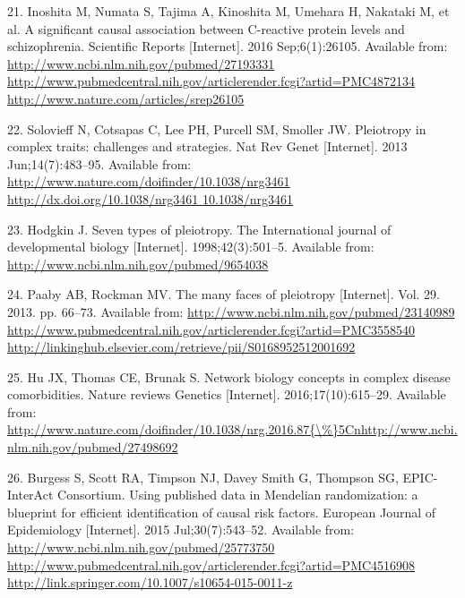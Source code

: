 \documentclass[]{article}
\begin{document}
\hypertarget{ref-Inoshita2016}{}
21. Inoshita M, Numata S, Tajima A, Kinoshita M, Umehara H, Nakataki M,
et al. A significant causal association between C-reactive protein
levels and schizophrenia. Scientific Reports {[}Internet{]}. 2016
Sep;6(1):26105. Available from:
\href{http://www.ncbi.nlm.nih.gov/pubmed/27193331\%20http://www.pubmedcentral.nih.gov/articlerender.fcgi?artid=PMC4872134\%20http://www.nature.com/articles/srep26105}{http://www.ncbi.nlm.nih.gov/pubmed/27193331 http://www.pubmedcentral.nih.gov/articlerender.fcgi?artid=PMC4872134 http://www.nature.com/articles/srep26105}

\hypertarget{ref-Solovieff2013}{}
22. Solovieff N, Cotsapas C, Lee PH, Purcell SM, Smoller JW. Pleiotropy
in complex traits: challenges and strategies. Nat Rev Genet
{[}Internet{]}. 2013 Jun;14(7):483--95. Available from:
\href{http://www.nature.com/doifinder/10.1038/nrg3461\%20http://dx.doi.org/10.1038/nrg3461\%2010.1038/nrg3461}{http://www.nature.com/doifinder/10.1038/nrg3461 http://dx.doi.org/10.1038/nrg3461 10.1038/nrg3461}

\hypertarget{ref-Hodgkin1998}{}
23. Hodgkin J. Seven types of pleiotropy. The International journal of
developmental biology {[}Internet{]}. 1998;42(3):501--5. Available from:
\url{http://www.ncbi.nlm.nih.gov/pubmed/9654038}

\hypertarget{ref-Paaby2013}{}
24. Paaby AB, Rockman MV. The many faces of pleiotropy {[}Internet{]}.
Vol. 29. 2013. pp. 66--73. Available from:
\href{http://www.ncbi.nlm.nih.gov/pubmed/23140989\%20http://www.pubmedcentral.nih.gov/articlerender.fcgi?artid=PMC3558540\%20http://linkinghub.elsevier.com/retrieve/pii/S0168952512001692}{http://www.ncbi.nlm.nih.gov/pubmed/23140989 http://www.pubmedcentral.nih.gov/articlerender.fcgi?artid=PMC3558540 http://linkinghub.elsevier.com/retrieve/pii/S0168952512001692}

\hypertarget{ref-Hu2016}{}
25. Hu JX, Thomas CE, Brunak S. Network biology concepts in complex
disease comorbidities. Nature reviews Genetics {[}Internet{]}.
2016;17(10):615--29. Available from:
\href{http://www.nature.com/doifinder/10.1038/nrg.2016.87\%7B/\%\%7D5Cnhttp://www.ncbi.nlm.nih.gov/pubmed/27498692}{http://www.nature.com/doifinder/10.1038/nrg.2016.87\{\textbackslash{}\%\}5Cnhttp://www.ncbi.nlm.nih.gov/pubmed/27498692}

\hypertarget{ref-Burgess2015b}{}
26. Burgess S, Scott RA, Timpson NJ, Davey Smith G, Thompson SG, EPIC-
InterAct Consortium. Using published data in Mendelian randomization: a
blueprint for efficient identification of causal risk factors. European
Journal of Epidemiology {[}Internet{]}. 2015 Jul;30(7):543--52.
Available from:
\href{http://www.ncbi.nlm.nih.gov/pubmed/25773750\%20http://www.pubmedcentral.nih.gov/articlerender.fcgi?artid=PMC4516908\%20http://link.springer.com/10.1007/s10654-015-0011-z}{http://www.ncbi.nlm.nih.gov/pubmed/25773750 http://www.pubmedcentral.nih.gov/articlerender.fcgi?artid=PMC4516908 http://link.springer.com/10.1007/s10654-015-0011-z}
\end{document}
